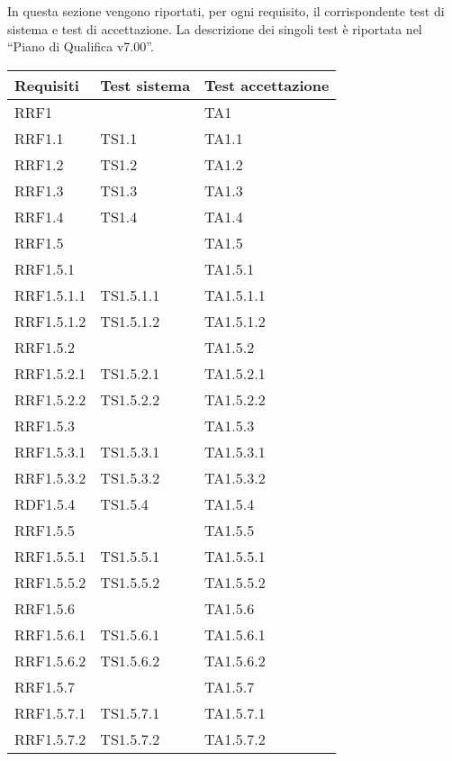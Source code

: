 	In questa sezione vengono riportati, per ogni requisito, il corrispondente test di sistema e test di accettazione.
La descrizione dei singoli test è riportata nel “Piano di Qualifica v7.00”.

	\begin{longtabu}{| X | X | X |}

			\hline
			\rowfont{\bf}
			Requisiti	&	Test sistema	&	Test accettazione \\ \hline 
			\endhead

				RRF1 	&		&	TA1	\\ \hline
				RRF1.1 	&	TS1.1	&	TA1.1 	\\ \hline
				RRF1.2 	&	TS1.2	&	TA1.2 	\\ \hline
				RRF1.3 	&	TS1.3 	&	TA1.3 	\\ \hline
				RRF1.4 	&	TS1.4 	&	TA1.4 	\\ \hline
				RRF1.5 	&		&	TA1.5 	\\ \hline
				RRF1.5.1 	&		&	TA1.5.1 	\\ \hline
				RRF1.5.1.1 	&	TS1.5.1.1 	&	TA1.5.1.1 	\\ \hline
				RRF1.5.1.2 	&	TS1.5.1.2 	&	TA1.5.1.2 	\\ \hline
				RRF1.5.2 	&		&	TA1.5.2 	\\ \hline
				RRF1.5.2.1 	&	TS1.5.2.1 	&	TA1.5.2.1 	\\ \hline
				RRF1.5.2.2 	&	TS1.5.2.2 	&	TA1.5.2.2 	\\ \hline
				RRF1.5.3 	&		&	TA1.5.3 	\\ \hline
				RRF1.5.3.1 	&	TS1.5.3.1 	&	TA1.5.3.1 	\\ \hline
				RRF1.5.3.2 	&	TS1.5.3.2 	&	TA1.5.3.2 	\\ \hline
				RDF1.5.4 	&	TS1.5.4 	&	TA1.5.4 	\\ \hline
				RRF1.5.5 	&		&	TA1.5.5 	\\ \hline
				RRF1.5.5.1 	&	TS1.5.5.1 	&	TA1.5.5.1 	\\ \hline
				RRF1.5.5.2 	&	TS1.5.5.2 	&	TA1.5.5.2 	\\ \hline
				RRF1.5.6 	&		&	TA1.5.6 	\\ \hline
				RRF1.5.6.1 	&	TS1.5.6.1 	&	TA1.5.6.1 	\\ \hline
				RRF1.5.6.2 	&	TS1.5.6.2 	&	TA1.5.6.2 	\\ \hline
				RRF1.5.7 	&		&	TA1.5.7 	\\ \hline
				RRF1.5.7.1 	&	TS1.5.7.1 	&	TA1.5.7.1 	\\ \hline
				RRF1.5.7.2 	&	TS1.5.7.2 	&	TA1.5.7.2 	\\ \hline

\end{longtabu}
